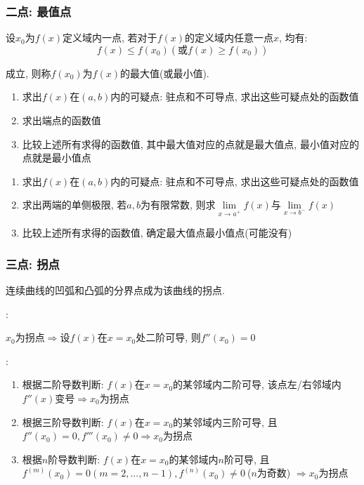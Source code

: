 \subsubsection{二点: 最值点}
设$ x_{0} $为$ f(x) $定义域内一点, 若对于$ f(x) $的定义域内任意一点$ x $, 均有:
\begin{equation*}
f(x)\le f(x_{0})(\text{或}f(x)\ge f(x_{0}))
\end{equation*}\par
成立, 则称$ f(x_{0}) $为$ f(x) $的最大值(或最小值).\par \vspace{.5em}
\begin{enumerate}
\item 求出$ f(x) $在$ (a,b) $内的可疑点: 驻点和不可导点, 求出这些可疑点处的函数值
\item 求出端点的函数值
\item 比较上述所有求得的函数值, 其中最大值对应的点就是最大值点, 最小值对应的点就是最小值点
\end{enumerate}
\begin{enumerate}
\item 求出$ f(x) $在$ (a,b) $内的可疑点: 驻点和不可导点, 求出这些可疑点处的函数值
\item 求出两端的单侧极限, 若$ a,b $为有限常数, 则求$ \lim\limits_{x\rightarrow a^{+}}f(x) $与$ \lim\limits_{x\rightarrow b^{-}}f(x) $
\item 比较上述所有求得的函数值, 确定最大值点最小值点(可能没有)
\end{enumerate}
\subsubsection{三点: 拐点}
连续曲线的凹弧和凸弧的分界点成为该曲线的拐点.\par \vspace{.5em}
: \par \vspace{.5em}
$ x_{0} $为拐点$ \Rightarrow $设$ f(x) $在$ x=x_{0} $处二阶可导, 则$ f''(x_{0})=0 $ \par \vspace{.5em}
:
\begin{enumerate}
\item 根据二阶导数判断: $ f(x) $在$ x=x_{0} $的某邻域内二阶可导, 该点左/右邻域内$ f''(x) $变号$ \Rightarrow x_{0}$为拐点
\item 根据三阶导数判断: $ f(x) $在$ x=x_{0} $的某邻域内三阶可导, 且$ f''(x_{0})=0, f'''(x_{0})\neq 0 $$ \Rightarrow x_{0}$为拐点
\item 根据$ n $阶导数判断: $ f(x) $在$ x=x_{0} $的某邻域内$ n $阶可导, 且$ f^{(m)}(x_{0})=0(m=2,...,n-1), f^{(n)}(x_{0})\neq 0\  $($ n $为奇数) $ \Rightarrow x_{0}$为拐点
\end{enumerate}
